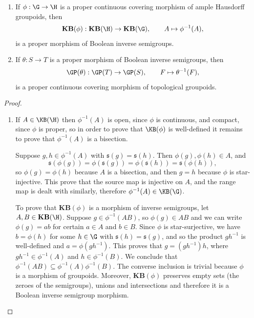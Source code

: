 \begin{proposition}
\begin{enumerate}
\item[(a)] If $\phi:\G\to\H$ is a proper continuous covering morphism of ample Hausdorff groupoids, then
\[\mathbf{KB}(\phi):\mathbf{KB}(\H)\to\mathbf{KB}(\G),\qquad A\mapsto\phi^{-1}(A),\]
 is a proper morphism of Boolean inverse semigroups.
\item[(b)] If $\theta:S\to T$ is a proper morphism of Boolean inverse semigroups, then
\[\GP(\theta):\GP(T)\to\GP(S),\qquad F\mapsto\theta^{-1}(F),\]
 is a proper continuous covering morphism of topological groupoids.
\end{enumerate}
\end{proposition}
\begin{proof}
\begin{enumerate}
\item[(a)] If $A\in\KB(\H)$ then $\phi^{-1}(A)$ is open, since $\phi$ is continuous, and compact, since $\phi$ is proper, so in order to prove that $\KB(\phi)$ is well-defined it remains to prove that $\phi^{-1}(A)$ is a bisection.
 
Suppose $g,h\in\phi^{-1}(A)$ with $\mathfrak{s}(g)=\mathfrak{s}(h)$. Then $\phi(g),\phi(h)\in A$, and
\[\mathfrak{s}(\phi(g))=\phi(\mathfrak{s}(g))=\phi(\mathfrak{s}(h))=\mathfrak{s}(\phi(h)),\]
so $\phi(g)=\phi(h)$ because $A$ is a bisection, and then $g=h$ because $\phi$ is star-injective. This prove that the source map is injective on $A$, and the range map is dealt with similarly, therefore $\phi^{-1}(A)\in \KB(\G)$.

To prove that $\mathbf{KB}(\phi)$ is a morphism of inverse semigroups, let $A,B\in\mathbf{KB}(\H)$. Suppose $g\in\phi^{-1}(AB)$, so $\phi(g)\in AB$ and we can write $\phi(g)=ab$ for certain $a\in A$ and $b\in B$. Since $\phi$ is star-surjective, we have $b=\phi(h)$ for some $h\in\G$ with $\mathfrak{s}(h)=\mathfrak{s}(g)$, and so the product $gh^{-1}$ is well-defined and $a=\phi(gh^{-1})$. This proves that $g=(gh^{-1})h$, where $gh^{-1}\in\phi^{-1}(A)$ and $h\in\phi^{-1}(B)$. We conclude that $\phi^{-1}(AB)\subseteq\phi^{-1}(A)\phi^{-1}(B)$. The converse inclusion is trivial because $\phi$ is a morphism of groupoids. Moreover, $\mathbf{KB}(\phi)$ preserves empty sets (the zeroes of the semigroups), unions and intersections and therefore it is a Boolean inverse semigroup morphism.


\end{enumerate}
\end{proof}
